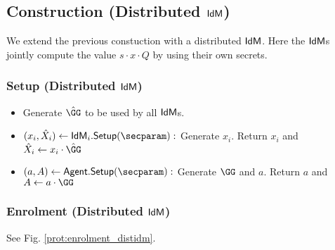 \subsection{Construction (Distributed $\textsf{IdM}$)}
We extend the previous constuction with a distributed $\textsf{IdM}$. Here the $\textsf{IdM}$s jointly compute the value $s\cdot x\cdot Q$ by using their own secrets.


\subsubsection{Setup (Distributed $\textsf{IdM}$)}
\begin{itemize}
    \item Generate $\GGhat$ to be used by all $\textsf{IdM}$s.
    \item $(x_i, \hat{X}_i) \gets \idm_i.\mathsf{Setup}(\secparam):$ Generate $x_i$. Return $x_i$ and $\hat{X}_i \gets x_i\cdot \GGhat$
    \item $(a, A) \gets \signserv.\mathsf{Setup}(\secparam):$ Generate $\GG$ and $a$. Return $a$ and $A \gets a\cdot \GG$
\end{itemize}


\subsubsection{Enrolment (Distributed $\textsf{IdM}$)}
See Fig. \ref{prot:enrolment_distidm}.
\begin{figure*}[h!]
\caption{Enrolment (Distributed \idm)}
\label{prot:enrolment_distidm}
\end{figure*}

